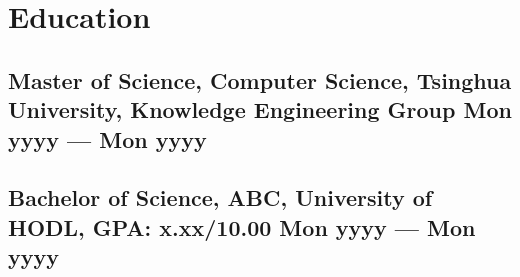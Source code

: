 \section{Education}
\subsection*{Master of Science, Computer Science, {\normalsize \normalfont Tsinghua University, Knowledge Engineering Group} \hfill Mon yyyy --- Mon yyyy} 
\vspace{0.1cm}
\subsection*{Bachelor of Science, ABC, {\normalsize \normalfont University of HODL, GPA: x.xx/10.00} \hfill Mon yyyy --- Mon yyyy} 
\vspace{0.2cm}